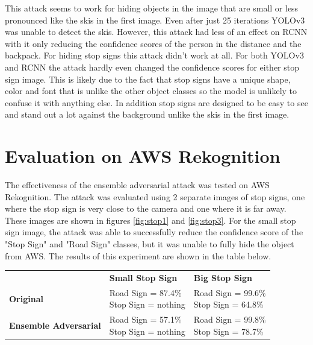 \documentclass{article}
\begin{document}
This attack seems to work for hiding objects in the image that are small or less pronounced like the skis in the first image. Even after just 25 iterations YOLOv3 was unable to detect the skis. However, this attack had less of an effect on RCNN with it only reducing the confidence scores of the person in the distance and the backpack. For hiding stop signs this attack didn't work at all. For both YOLOv3 and RCNN the attack hardly even changed the confidence scores for either stop sign image. This is likely due to the fact that stop signs have a unique shape, color and font that is unlike the other object classes so the model is unlikely to confuse it with anything else. In addition stop signs are designed to be easy to see and stand out a lot against the background unlike the skis in the first image.

\section{Evaluation on AWS Rekognition}
The effectiveness of the ensemble adversarial attack was tested on AWS Rekognition. The attack was evaluated using 2 separate images of stop signs, one where the stop sign is very close to the camera and one where it is far away. These images are shown in figures \ref{fig:stop1} and \ref{fig:stop3}. For the small stop sign image, the attack was able to successfully reduce the confidence score of the "Stop Sign" and "Road Sign" classes, but it was unable to fully hide the object from AWS. The results of this experiment are shown in the table below.

\begin{center}
\begin{tabular}{l l l}
    & \textbf{Small Stop Sign} & \textbf{Big Stop Sign} \\

    \textbf{Original} & \makecell{Road Sign = 87.4\% \\ Stop Sign = nothing} & \makecell{Road Sign = 99.6\% \\ Stop Sign = 64.8\%} \\

    \textbf{Ensemble Adversarial} & \makecell{Road Sign = 57.1\% \\ Stop Sign = nothing} & \makecell{Road Sign = 99.8\% \\ Stop Sign = 78.7\%} \\
\end{tabular}
\end{center}
\end{document}
